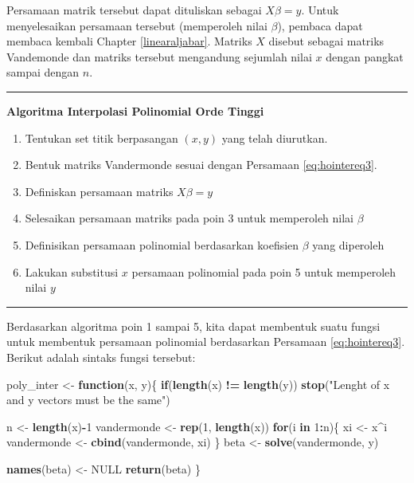 \documentclass[]{book}
\newenvironment{Shaded}{\begin{snugshade}}{\end{snugshade}}
\newcommand{\ControlFlowTok}[1]{\textcolor[rgb]{0.13,0.29,0.53}{\textbf{#1}}}
\newcommand{\DecValTok}[1]{\textcolor[rgb]{0.00,0.00,0.81}{#1}}
\newcommand{\KeywordTok}[1]{\textcolor[rgb]{0.13,0.29,0.53}{\textbf{#1}}}
\newcommand{\NormalTok}[1]{#1}
\newcommand{\OperatorTok}[1]{\textcolor[rgb]{0.81,0.36,0.00}{\textbf{#1}}}
\newcommand{\OtherTok}[1]{\textcolor[rgb]{0.56,0.35,0.01}{#1}}
\newcommand{\StringTok}[1]{\textcolor[rgb]{0.31,0.60,0.02}{#1}}
\providecommand{\tightlist}{%
  \setlength{\itemsep}{0pt}\setlength{\parskip}{0pt}}
\theoremstyle{definition}
\theoremstyle{definition}
\theoremstyle{definition}
\theoremstyle{remark}
\begin{document}
Persamaan matrik tersebut dapat dituliskan sebagai \(X\beta = y\). Untuk menyelesaikan persamaan tersebut (memperoleh nilai \(\beta\)), pembaca dapat membaca kembali Chapter \ref{linearaljabar}. Matriks \(X\) disebut sebagai matriks Vandemonde dan matriks tersebut mengandung sejumlah nilai \(x\) dengan pangkat sampai dengan \(n\).

\begin{center}\rule{0.5\linewidth}{\linethickness}\end{center}

\textbf{Algoritma Interpolasi Polinomial Orde Tinggi}

\begin{enumerate}
\def\labelenumi{\arabic{enumi}.}
\tightlist
\item
  Tentukan set titik berpasangan \(\left(x,y\right)\) yang telah diurutkan.
\item
  Bentuk matriks Vandermonde sesuai dengan Persamaan \eqref{eq:hointereq3}.
\item
  Definiskan persamaan matriks \(X\beta=y\)
\item
  Selesaikan persamaan matriks pada poin 3 untuk memperoleh nilai \(\beta\)
\item
  Definisikan persamaan polinomial berdasarkan koefisien \(\beta\) yang diperoleh
\item
  Lakukan substitusi \(x\) persamaan polinomial pada poin 5 untuk memperoleh nilai \(y\)
\end{enumerate}

\begin{center}\rule{0.5\linewidth}{\linethickness}\end{center}

Berdasarkan algoritma poin 1 sampai 5, kita dapat membentuk suatu fungsi untuk membentuk persamaan polinomial berdasarkan Persamaan \eqref{eq:hointereq3}. Berikut adalah sintaks fungsi tersebut:

\begin{Shaded}
\begin{Highlighting}[]
\NormalTok{poly_inter <-}\StringTok{ }\ControlFlowTok{function}\NormalTok{(x, y)\{}
  \ControlFlowTok{if}\NormalTok{(}\KeywordTok{length}\NormalTok{(x) }\OperatorTok{!=}\StringTok{ }\KeywordTok{length}\NormalTok{(y))}
    \KeywordTok{stop}\NormalTok{(}\StringTok{"Lenght of x and y vectors must be the same"}\NormalTok{)}
  
\NormalTok{  n <-}\StringTok{ }\KeywordTok{length}\NormalTok{(x)}\OperatorTok{-}\DecValTok{1}
\NormalTok{  vandermonde <-}\StringTok{ }\KeywordTok{rep}\NormalTok{(}\DecValTok{1}\NormalTok{, }\KeywordTok{length}\NormalTok{(x))}
  \ControlFlowTok{for}\NormalTok{(i }\ControlFlowTok{in} \DecValTok{1}\OperatorTok{:}\NormalTok{n)\{}
\NormalTok{    xi <-}\StringTok{ }\NormalTok{x}\OperatorTok{^}\NormalTok{i}
\NormalTok{    vandermonde <-}\StringTok{ }\KeywordTok{cbind}\NormalTok{(vandermonde, xi)}
\NormalTok{  \}}
\NormalTok{  beta <-}\StringTok{ }\KeywordTok{solve}\NormalTok{(vandermonde, y)}
  
  \KeywordTok{names}\NormalTok{(beta) <-}\StringTok{ }\OtherTok{NULL}
  \KeywordTok{return}\NormalTok{(beta)}
\NormalTok{\}}
\end{Highlighting}
\end{Shaded}
\end{document}
